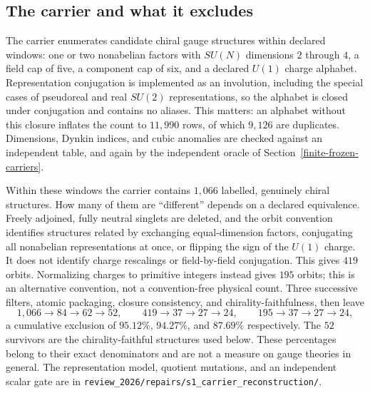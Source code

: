 \documentclass[11pt]{article}
\theoremstyle{definition}
\begin{document}
\subsection{The carrier and what it excludes}\label{unconditional-exclusion-sim-99.3-of-chiral-gauge-structures}

The carrier enumerates candidate chiral gauge structures within declared windows: one or two nonabelian factors
with \(SU(N)\) dimensions \(2\) through \(4\), a field cap of five, a component cap of six, and a declared
\(U(1)\) charge alphabet. Representation conjugation is implemented as an involution, including the special cases of
pseudoreal and real \(SU(2)\) representations, so the alphabet is closed under conjugation and contains no aliases.
This matters: an alphabet without this closure inflates the count to \(11{,}990\) rows, of which \(9{,}126\) are
duplicates. Dimensions, Dynkin indices, and cubic anomalies are checked against an independent table, and again by the
independent oracle of Section~\ref{finite-frozen-carriers}.

Within these windows the carrier contains \(1{,}066\) labelled, genuinely chiral structures. How many of them are
``different'' depends on a declared equivalence. Freely adjoined, fully neutral singlets are deleted, and the orbit
convention identifies structures related by exchanging equal-dimension factors, conjugating all nonabelian
representations at once, or flipping the sign of the \(U(1)\) charge. It does not identify charge rescalings or
field-by-field conjugation. This gives \(419\) orbits. Normalizing charges to primitive integers instead gives \(195\)
orbits; this is an alternative convention, not a convention-free physical count. Three successive filters, atomic packaging, closure
consistency, and chirality-faithfulness, then leave
\[
1{,}066\to84\to62\to52,\qquad
419\to37\to27\to24,\qquad
195\to37\to27\to24,
\]
a cumulative exclusion of \(95.12\%\), \(94.27\%\), and \(87.69\%\) respectively. The \(52\) survivors are the
chirality-faithful structures used below.
These percentages belong to their exact denominators and are not a measure on gauge theories in general. The
representation model, quotient mutations, and an independent scalar gate are in
\nolinkurl{review_2026/repairs/s1_carrier_reconstruction/}.
\end{document}
